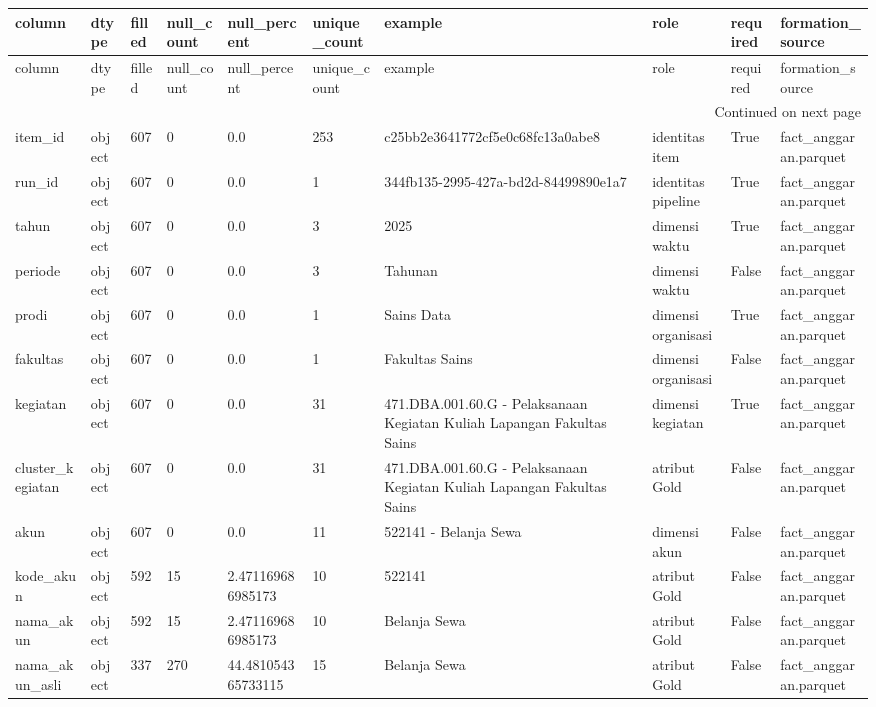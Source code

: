 \begingroup
\scriptsize
\begin{longtable}{llllllllll}
\toprule
column & dtype & filled & null_count & null_percent & unique_count & example & role & required & formation_source \\
\midrule
\endfirsthead
\toprule
column & dtype & filled & null_count & null_percent & unique_count & example & role & required & formation_source \\
\midrule
\endhead
\midrule
\multicolumn{10}{r}{Continued on next page} \\
\midrule
\endfoot
\bottomrule
\endlastfoot
item\_id & object & 607 & 0 & 0.0 & 253 & c25bb2e3641772cf5e0c68fc13a0abe8 & identitas item & True & fact\_anggaran.parquet \\
run\_id & object & 607 & 0 & 0.0 & 1 & 344fb135-2995-427a-bd2d-84499890e1a7 & identitas pipeline & True & fact\_anggaran.parquet \\
tahun & object & 607 & 0 & 0.0 & 3 & 2025 & dimensi waktu & True & fact\_anggaran.parquet \\
periode & object & 607 & 0 & 0.0 & 3 & Tahunan & dimensi waktu & False & fact\_anggaran.parquet \\
prodi & object & 607 & 0 & 0.0 & 1 & Sains Data & dimensi organisasi & True & fact\_anggaran.parquet \\
fakultas & object & 607 & 0 & 0.0 & 1 & Fakultas Sains & dimensi organisasi & False & fact\_anggaran.parquet \\
kegiatan & object & 607 & 0 & 0.0 & 31 & 471.DBA.001.60.G - Pelaksanaan Kegiatan Kuliah Lapangan Fakultas Sains & dimensi kegiatan & True & fact\_anggaran.parquet \\
cluster\_kegiatan & object & 607 & 0 & 0.0 & 31 & 471.DBA.001.60.G - Pelaksanaan Kegiatan Kuliah Lapangan Fakultas Sains & atribut Gold & False & fact\_anggaran.parquet \\
akun & object & 607 & 0 & 0.0 & 11 & 522141 - Belanja Sewa & dimensi akun & False & fact\_anggaran.parquet \\
kode\_akun & object & 592 & 15 & 2.471169686985173 & 10 & 522141 & atribut Gold & False & fact\_anggaran.parquet \\
nama\_akun & object & 592 & 15 & 2.471169686985173 & 10 & Belanja Sewa & atribut Gold & False & fact\_anggaran.parquet \\
nama\_akun\_asli & object & 337 & 270 & 44.481054365733115 & 15 & Belanja Sewa & atribut Gold & False & fact\_anggaran.parquet \\

\end{longtable}
